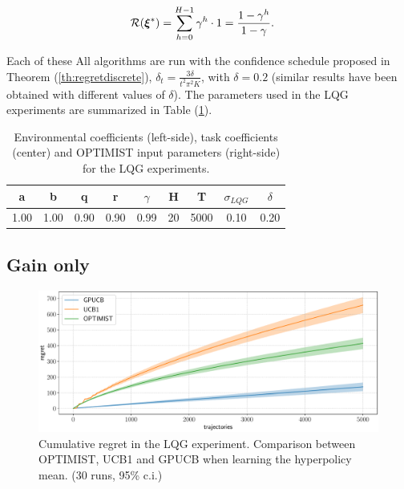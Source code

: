 \begin{align}
\mathcal{R}(\boldsymbol{\xi}^*)
&= \sum_{h=0}^{H-1}\gamma^h\cdot 1 = \frac{1-\gamma^h}{1-\gamma}.
\end{align}
 
Each of these  All algorithms are run with the confidence schedule proposed in Theorem (\ref{th:regretdiscrete}), \ie $\delta_t = \frac{3\delta}{t^2\pi^2K}$, with $\delta=0.2$ (similar results have been obtained with different values of $\delta$). The parameters used in the \gls{LQG} experiments are summarized in Table (\ref{tab:LQGcoeff}).


\begin{table}[t!]
\centering
\begin{tabular}{cccc|cccc|c} 
\toprule
a & b & q & r & $\gamma$ & H & T & $\sigma_{LQG}$ & $\delta$\\ 
\midrule
1.00 & 1.00 & 0.90 & 0.90 & 0.99 & 20 & 5000 & 0.10 & 0.20\\
\bottomrule
\end{tabular}
\caption{Environmental coefficients (left-side), task coefficients (center) and \gls{OPTIMIST} input parameters (right-side) for the \gls{LQG} experiments.}
\label{tab:LQGcoeff}
\end{table}


\subsection{Gain only}

\begin{figure}[t!]
\centering
\includegraphics[width=\textwidth,height=\textheight,keepaspectratio]{Images/LQGcomparison.pdf}
\caption{Cumulative regret in
the \gls{LQG} experiment. Comparison between
\gls{OPTIMIST}, \gls{UCB}1 and \gls{GPUCB} when learning the hyperpolicy mean.
(30 runs, 95\% c.i.)}
\label{fig:LQGcomparison}
\end{figure}

